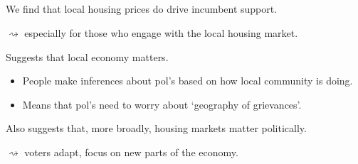 \documentclass[10pt,aspectratio=169,handout]{beamer}
\begin{document}
\subsection{}
\begin{frame}
We find that local housing prices do drive incumbent support. \pause

$\rightsquigarrow$ especially for those who engage with the local housing market. \pause

\vspace{0.2in}
Suggests that local economy matters. \pause
\begin{itemize}[<+->]
\item People make inferences about pol's based on how local community is doing.
\item Means that pol's need to worry about `geography of grievances'.
\end{itemize}

\vspace{0.2in} \pause
Also suggests that, more broadly, housing markets matter politically.

$\rightsquigarrow$ voters adapt, focus on new parts of the economy. 
\end{frame}

\appendix

	
\end{document}
